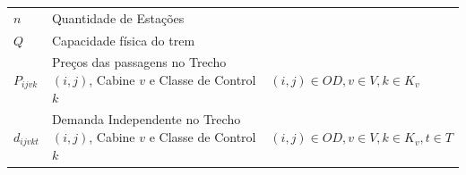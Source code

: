 \begin{table}[H]
\begin{tabular}{p{2cm} p{9.5cm} p{3.2cm}}
		$n$                & Quantidade de Estações                                                                                                                                                                                                                                                                                                                                                                                                        &                                              \\
		$Q$                & Capacidade física do trem                                                                                                                                                                                                                                                                                                                                                                                                     &                                              \\
		$P_{ijvk}$         & Preços  das passagens no Trecho $(i,j)$, Cabine $v$ e Classe de Control $k$                                                                                                                                                                                                                                                                                                                                                    & $(i,j) \in OD,v \in V, k \in K_v$            \\
		$d_{ijvkt}$        & Demanda Independente no Trecho $(i,j)$, Cabine $v$ e Classe de Control $k$                                                                                                                                                                                                                                                                                                                                                   & $(i,j) \in OD,v \in V, k \in K_v, t \in T$   \\ \midrule

\end{tabular}
\end{table}
